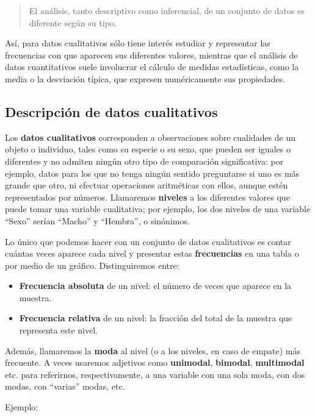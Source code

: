 \documentclass[
  spanish,
  letterpaper,
  DIV=11,
  numbers=noendperiod]{scrreprt}
\begin{document}
\begin{quote}
El análisis, tanto descriptivo como inferencial, de un conjunto de datos
es diferente según su tipo.
\end{quote}

Así, para datos cualitativos sólo tiene interés estudiar y representar
las frecuencias con que aparecen sus diferentes valores, mientras que el
análisis de datos cuantitativos suele involucrar el cálculo de medidas
estadísticas, como la media o la desviación típica, que expresen
numéricamente sus propiedades.

\subsection{Descripción de datos
cualitativos}\label{descripciuxf3n-de-datos-cualitativos}

Los \textbf{datos cualitativos} corresponden a observaciones sobre
cualidades de un objeto o individuo, tales como su especie o su sexo,
que pueden ser iguales o diferentes y no admiten ningún otro tipo de
comparación significativa: por ejemplo, datos para los que no tenga
ningún sentido preguntarse si uno es más grande que otro, ni efectuar
operaciones aritméticas con ellos, aunque estén representados por
números. Llamaremos \textbf{niveles} a los diferentes valores que puede
tomar una variable cualitativa; por ejemplo, los dos niveles de una
variable ``Sexo'' serían ``Macho'' y ``Hembra'', o sinónimos.

Lo único que podemos hacer con un conjunto de datos cualitativos es
contar cuántas veces aparece cada nivel y presentar estas
\textbf{frecuencias} en una tabla o por medio de un gráfico.
Distinguiremos entre:

\begin{itemize}
\item
  \textbf{Frecuencia absoluta} de un nivel: el número de veces que
  aparece en la muestra.
\item
  \textbf{Frecuencia relativa} de un nivel: la fracción del total de la
  muestra que representa este nivel.
\end{itemize}

Además, llamaremos la \textbf{moda} al nivel (o a los niveles, en caso
de empate) más frecuente. A veces usaremos adjetivos como
\textbf{unimodal}, \textbf{bimodal}, \textbf{multimodal} etc. para
referirnos, respectivamente, a una variable con una sola moda, con dos
modas, con ``varias'' modas, etc.

Ejemplo:
\end{document}
